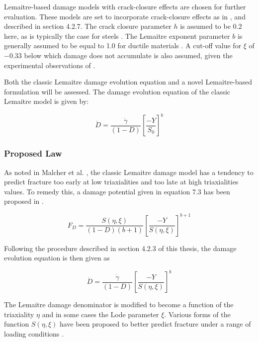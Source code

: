 \documentclass[sn-mathphys,Numbered,draft]{sn-jnl}%
\begin{document}
Lemaitre-based damage models with crack-closure effects are chosen for further evaluation. These models are set to incorporate crack-closure effects as in \citet{pires_issues_2005,teixeira_ductile_2010}, and described in section 4.2.7. The crack closure parameter $h$ is assumed to be $0.2$ here, as is typically the case for steels \cite{desmorat_modeling_2008,lemaitre_course_1996,bouchard_enhanced_2011}. The Lemaitre exponent parameter $b$ is generally assumed to be equal to 1.0 for ductile materials \cite{lemaitre_continuous_1985,malcher_improved_2014}. A cut-off value  for $\xi$ of $-0.33$ below which damage does not accumulate is also assumed, given the experimental observations of \citet{bao_cut-off_2005}.

Both the classic Lemaitre \cite{lemaitre_continuous_1985} damage evolution equation and a novel Lemaitre-based formulation will be assessed. The damage evolution equation of the classic Lemaitre model is given by:

\begin{equation}
	\dot{D}=\frac{\dot{\gamma}}{\left(1-D\right)}\left[\frac{-Y}{S_0}\right]^b
\end{equation}

\subsubsection{Proposed Law}

As noted in Malcher et al. \cite{malcher_improved_2014}, the classic Lemaitre damage model has a tendency to predict fracture too early at low triaxialities and too late at high triaxialities values. To remedy this, a damage potential given in equation 7.3 has been  proposed in \citet{malcher_improved_2014}.

\begin{equation}
	F_{D}=\frac{S(\eta,\xi)}{\left(1-D\right)\left(b+1\right)}\left[\frac{-Y}{S(\eta,\xi)}\right]^{b+1}
\end{equation}

 Following the procedure described in section 4.2.3 of this thesis, the damage evolution equation is then given as

 \begin{equation}
	\dot{D}=\frac{\dot{\gamma}}{\left(1-D\right)}\left[\frac{-Y}{S(\eta,\xi)}\right]^b
\end{equation}

The Lemaitre damage denominator is modified to become a function of the triaxiality $\eta$ and in some cases the Lode parameter $\xi$. Various forms of the function $S(\eta,\xi)$ have been proposed to better predict fracture under a range of loading conditions \cite{ferreira_improved_2022,castro_calibration_2018}. 
\end{document}
